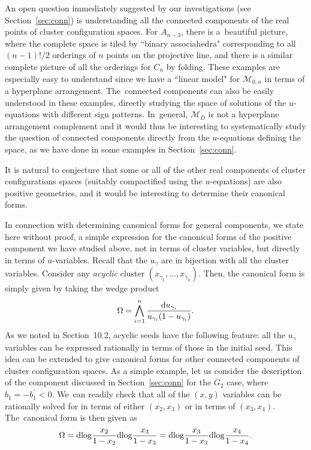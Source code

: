 \documentclass[pdftex]{sigma}%
\def\M{{\mathcal{M}}}
\numberwithin{equation}{section}
\begin{document}
\bigskip{}
An open question immediately suggested by our investigations (see Section~\ref{sec:conn}) is understanding all the connected components of the real points of cluster configuration spaces. For $A_{n-3}$, there is a~beautiful picture, where the complete space is tiled by ``binary associahedra" corresponding to all $(n{-}1)!/2$ orderings of $n$ points on the projective line, and there is a similar complete picture of all the orderings for $C_n$ by folding. These examples are especially easy to understand since we have a ``linear model" for $\M_{0,n}$ in terms of a hyperplane arrangement. The~connected components can also be easily understood in these examples, directly studying the space of solutions of the $u$-equations with different sign patterns. In~general, $\M_D$ is not a hyperplane arrangement complement and it would thus be interesting to systematically study the question of connected components directly from the $u$-equations defining the space, as we have done in some examples in Section~\ref{sec:conn}.

It is natural to conjecture that some or all of the other real components of cluster configurations spaces (suitably compactified using the $u$-equations) are also positive geometries, and it would be interesting to determine their canonical forms.

In connection with determining canonical forms for general components, we state here without proof, a simple expression for the canonical forms of the positive component we have studied above, not in terms of cluster variables, but directly in terms of $u$-variables. Recall that the $u_\gamma$ are in bijection with all the cluster variables. Consider any {\it acyclic} cluster $(x_{\gamma_1}, \dots, x_{\gamma_n})$. Then, the canonical form is simply given by taking the wedge product
\begin{gather}\label{eq:canform}
\Omega = \bigwedge_{i=1}^n \frac{{\rm d} u_{\gamma_i}}{u_{\gamma_i} (1 - u_{\gamma_i})}.
\end{gather}
As we noted in Section~10.2, acyclic seeds have the following feature: all the $u_\gamma$ variables can be expressed rationally in terms of those in the initial seed. This idea can be extended to give canonical forms for other connected components of cluster configuration spaces. As a simple example, let us consider the description of the component discussed in Section~\ref{sec:conn} for the $G_2$ case, where $b_1 = - b^\prime_1 < 0$. We~can readily check that all of the $(x,y)$ variables can be rationally solved for in terms of either $(x_2,x_3)$ or in terms of $(x_3,x_4)$. The~canonical form is then given as
\begin{gather*}
\Omega = {\rm d log} \frac{x_2}{1-x_2} {\rm d log} \frac{x_3}{1-x_3} = {\rm d log} \frac{x_3}{1-x_3} {\rm d log} \frac{x_4}{1-x_4}.
\end{gather*}
\end{document}
